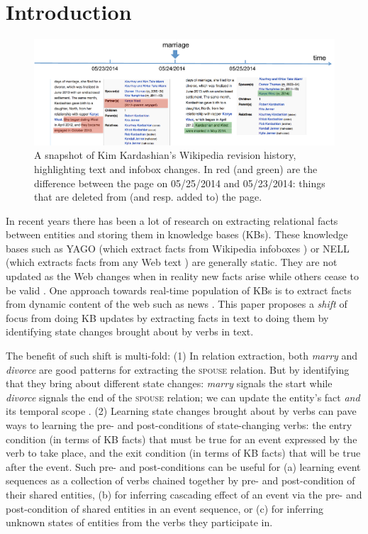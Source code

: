 \section{Introduction}

\begin{figure}[t]
\begin{center}
\includegraphics[width=16cm,keepaspectratio=true]{figures/motivation.pdf}
\caption{\label{fig:motivation} A snapshot of Kim Kardashian's Wikipedia revision history, highlighting text and infobox changes. In red (and green) are the difference between the page on 05/25/2014 and 05/23/2014: things that are deleted from (and resp. added to) the page.}
\end{center}
\end{figure}

In recent years there has been a lot of research on extracting relational facts between entities and storing them in knowledge bases (KBs). These knowledge bases such as YAGO (which extract facts from Wikipedia infoboxes \cite{suchanek2007yago}) or NELL (which extracts facts from any Web text \cite{carlson2010toward,fader2011identifying}) are generally static. They are not updated as the Web changes when in reality new facts arise while others cease to be valid%
. One approach towards real-time population of KBs is to extract facts from dynamic content of the web such as news \cite{nakashole2012real}. This paper proposes a \textit{shift} of focus from doing KB updates by extracting facts in text to doing them by identifying state changes brought about by verbs in text. 

The benefit of such shift is multi-fold: (1) In relation extraction, both \textit{marry} and \textit{divorce} are good patterns for extracting the \textsc{spouse} relation. But by identifying that they bring about different state changes: \textit{marry} signals the start while \textit{divorce} signals the end of the \textsc{spouse} relation; we can update the entity's fact \textit{and} its temporal scope \cite{wijayactp}. (2) Learning state changes brought about by verbs can pave ways to learning the pre- and post-conditions of state-changing verbs: the entry condition (in terms of KB facts) that must be true for an event expressed by the verb to take place, and the exit condition (in terms of KB facts) that will be true after the event. Such pre- and post-conditions can be useful for (a) learning event sequences %
as a collection of verbs chained together by pre- and post-condition of their shared entities, (b) for inferring cascading effect of an event via the pre- and post-condition of shared entities in an event sequence, or (c) for inferring unknown states of entities from the verbs they participate in.  

